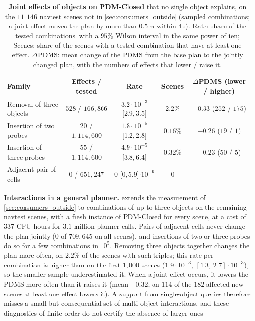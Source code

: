 \documentclass[10pt,letterpaper]{article}
\newcommand{\ci}[2]{[#1,\allowbreak\,#2]}
\newcommand{\na}{--}
\theoremstyle{remark}
\theoremstyle{plain}
\theoremstyle{definition}
\begin{document}
\begin{table}[!htbp]
\centering
\caption{\textbf{Joint effects of objects on PDM-Closed} that no single object explains, on the $11{,}146$ navtest scenes not in \cref{sec:consumers_outside} (sampled combinations; a joint effect moves the plan by more than $0.5$\,m within $4$\,s). Rate: share of the tested combinations, with a $95\%$ Wilson interval in the same power of ten; Scenes: share of the scenes with a tested combination that have at least one effect. $\Delta$PDMS: mean change of the PDMS from the base plan to the jointly changed plan, with the numbers of effects that lower / raise it.}
\label{tab:interactions}
\small
\setlength{\tabcolsep}{2.6pt}
\begin{tabular}{@{}lcccc@{}}
\toprule
Family & Effects / tested & Rate & Scenes & $\Delta$PDMS (lower / higher) \\
\midrule
Removal of three objects & $528$ / $166{,}866$ & $3.2\cdot10^{-3}$ \ci{2.9}{3.5} & $2.2\%$ & $-0.33$ ($252$ / $175$) \\
Insertion of two probes & $20$ / $1{,}114{,}600$ & $1.8\cdot10^{-5}$ \ci{1.2}{2.8} & $0.16\%$ & $-0.26$ ($19$ / $1$) \\
Insertion of three probes & $55$ / $1{,}114{,}600$ & $4.9\cdot10^{-5}$ \ci{3.8}{6.4} & $0.32\%$ & $-0.23$ ($50$ / $5$) \\
Adjacent pair of cells & $0$ / $651{,}247$ & $0$ \ci{0}{5.9}$\cdot10^{-6}$ & $0$ & \na \\
\bottomrule
\end{tabular}
\end{table}

\noindent\textbf{Interactions in a general planner.}
 extends the measurement of \cref{sec:consumers_outside} to combinations of up to three objects on the remaining navtest scenes, with a fresh instance of PDM-Closed for every scene, at a cost of $337$ CPU hours for $3.1$ million planner calls.
Pairs of adjacent cells never change the plan jointly ($0$ of $709{,}645$ on all scenes), and insertions of two or three probes do so for a few combinations in $10^{5}$.
Removing three objects together changes the plan more often, on $2.2\%$ of the scenes with such triples; this rate per combination is higher than on the first $1{,}000$ scenes ($1.9\cdot10^{-3}$, $\ci{1.3}{2.7}\cdot10^{-3}$), so the smaller sample underestimated it.
When a joint effect occurs, it lowers the PDMS more often than it raises it (mean $-0.32$; on $114$ of the $182$ affected new scenes at least one effect lowers it).
A support from single-object queries therefore misses a small but consequential set of multi-object interactions, and these diagnostics of finite order do not certify the absence of larger ones.
\end{document}
